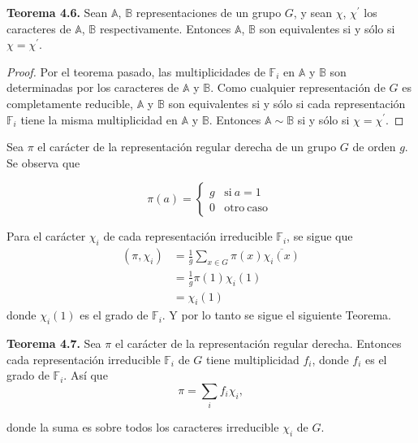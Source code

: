 \documentclass[12pt]{book}
\theoremstyle{definition}
\newcounter{in}
\begin{document}
\textbf{Teorema 4.6. } Sean $\mathbb{A}$, $\mathbb{B}$
representaciones de un grupo $G$, y sean $\chi$, $\chi^{'}$ los
caracteres de $\mathbb{A}$, $\mathbb{B}$ respectivamente. Entonces
$\mathbb{A}$, $\mathbb{B}$ son equivalentes si y sólo si
$\chi=\chi^{'}$.

\begin{proof}
  Por el teorema pasado, las multiplicidades de $\mathbb{F}_{i}$ en
  $\mathbb{A}$ y $\mathbb{B}$ son determinadas por los caracteres de
  $\mathbb{A}$ y $\mathbb{B}$. Como cualquier representación de $G$ es
  completamente reducible, $\mathbb{A}$ y $\mathbb{B}$ son
  equivalentes si y sólo si cada representación $\mathbb{F}_{i}$ tiene
  la misma multiplicidad en $\mathbb{A}$ y $\mathbb{B}$. Entonces
  $\mathbb{A} \sim \mathbb{B}$ si y sólo si $\chi=\chi^{'}$.
\end{proof}

Sea $\pi$ el carácter de la representación regular derecha de un grupo
$G$ de orden $g$. Se observa que

\begin{equation}\label{PR}
         \pi(a) = \left\{
	       \begin{array}{ll}
		 g      & \mathrm{si\ } a = 1 \\
		 0      & \mathrm{otro\ caso\ } 
	       \end{array}
	     \right.
\end{equation}

Para el carácter $\chi_{i}$ de cada representación irreducible
$\mathbb{F}_{i}$, se sigue que
\begin{equation*}
  \begin{aligned}
    (\pi,\chi_{i}) & =\frac{1}{g} \sum_{x \in G} \pi(x) \overline{\chi_{i}(x)} \\
    &=\frac{1}{g} \pi(1) \chi_{i}(1) \\
    &=\chi_{i}(1) 
  \end{aligned}
\end{equation*}
donde $\chi_{i}(1)$ es el grado de $\mathbb{F}_{i}$. Y por lo tanto se
sigue el siguiente Teorema.

\textbf{Teorema 4.7.} Sea $\pi$ el carácter de la representación
regular derecha. Entonces cada representación irreducible
$\mathbb{F}_{i}$ de $G$ tiene multiplicidad $f_{i}$, donde $f_{i}$ es
el grado de $\mathbb{F}_{i}$. Así que
\begin{equation*}
  \pi=\sum_{i} f_{i} \chi_{i},
\end{equation*}

donde la suma es sobre todos los caracteres irreducible $\chi_{i}$ de $G$.
\end{document}
